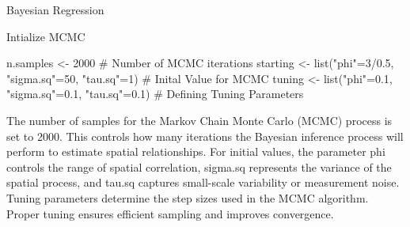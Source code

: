 \documentclass[
  ignorenonframetext,
]{beamer}
\newenvironment{Shaded}{\begin{snugshade}}{\end{snugshade}}
\newcommand{\CommentTok}[1]{\textcolor[rgb]{0.37,0.37,0.37}{#1}}
\newcommand{\DecValTok}[1]{\textcolor[rgb]{0.68,0.00,0.00}{#1}}
\newcommand{\FloatTok}[1]{\textcolor[rgb]{0.68,0.00,0.00}{#1}}
\newcommand{\FunctionTok}[1]{\textcolor[rgb]{0.28,0.35,0.67}{#1}}
\newcommand{\NormalTok}[1]{\textcolor[rgb]{0.00,0.23,0.31}{#1}}
\newcommand{\OtherTok}[1]{\textcolor[rgb]{0.00,0.23,0.31}{#1}}
\newcommand{\SpecialCharTok}[1]{\textcolor[rgb]{0.37,0.37,0.37}{#1}}
\newcommand{\StringTok}[1]{\textcolor[rgb]{0.13,0.47,0.30}{#1}}
\begin{document}
\begin{frame}[fragile]{Bayesian Regression}
\label{bayesian-regression-1}
\begin{block}{Intialize MCMC}
\label{intialize-mcmc}
\begin{Shaded}
\begin{Highlighting}[]
\NormalTok{n.samples }\OtherTok{\textless{}{-}} \DecValTok{2000} \CommentTok{\# Number of MCMC iterations}
\NormalTok{starting }\OtherTok{\textless{}{-}} \FunctionTok{list}\NormalTok{(}\StringTok{"phi"}\OtherTok{=}\DecValTok{3}\SpecialCharTok{/}\FloatTok{0.5}\NormalTok{, }\StringTok{"sigma.sq"}\OtherTok{=}\DecValTok{50}\NormalTok{, }\StringTok{"tau.sq"}\OtherTok{=}\DecValTok{1}\NormalTok{) }\CommentTok{\# Inital Value for MCMC}
\NormalTok{tuning }\OtherTok{\textless{}{-}} \FunctionTok{list}\NormalTok{(}\StringTok{"phi"}\OtherTok{=}\FloatTok{0.1}\NormalTok{, }\StringTok{"sigma.sq"}\OtherTok{=}\FloatTok{0.1}\NormalTok{, }\StringTok{"tau.sq"}\OtherTok{=}\FloatTok{0.1}\NormalTok{) }\CommentTok{\# Defining Tuning Parameters}
\end{Highlighting}
\end{Shaded}

The number of samples for the Markov Chain Monte Carlo (MCMC) process is
set to 2000. This controls how many iterations the Bayesian inference
process will perform to estimate spatial relationships. For initial
values, the parameter phi controls the range of spatial correlation,
sigma.sq represents the variance of the spatial process, and tau.sq
captures small-scale variability or measurement noise. Tuning parameters
determine the step sizes used in the MCMC algorithm. Proper tuning
ensures efficient sampling and improves convergence.
\end{block}
\end{frame}
\end{document}

